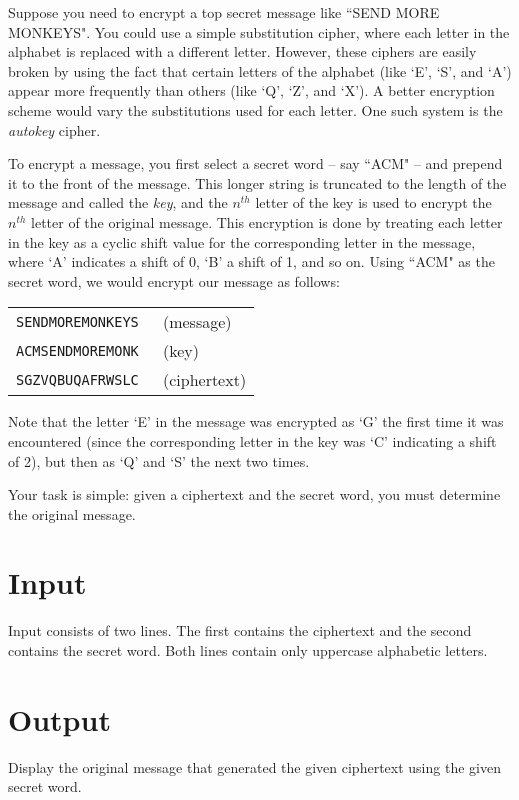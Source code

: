
Suppose you need to encrypt a top secret message like ``SEND MORE MONKEYS".
You could use a simple substitution cipher, where each letter in the alphabet is
replaced with a different letter.  However, these ciphers are easily broken
by using the
fact that certain letters of the alphabet (like `E', `S', and `A') appear more
frequently than others (like `Q', `Z', and `X').  A better encryption scheme would
vary the substitutions used for each letter.  One such system is the
{\it autokey} cipher.

To encrypt a message, you first select a secret word -- say ``ACM" -- and prepend
it to the front of the message.  This longer string is truncated to the length
of the message and called the
{\it key}, and the $n^{th}$ letter of the key is used to encrypt the
$n^{th}$ letter of
the original message.  This encryption is done by treating each letter in the
key as a cyclic shift value for the corresponding letter in the message, where
`A' indicates a shift of 0, `B' a shift of 1, and so on.  Using ``ACM" as the
secret word, we would encrypt our message as follows:
\begin{center}
\begin{tabular}{ll}
\tt SENDMOREMONKEYS & (message) \\
\tt ACMSENDMOREMONK & (key) \\ \hline
\tt SGZVQBUQAFRWSLC & (ciphertext) \\
\end{tabular}
\end{center}
Note that the letter `E' in the message was encrypted as `G' the first time it
was encountered (since the corresponding letter in the key was `C' indicating
a shift of 2), but then as `Q' and `S' the next two times.

Your task is simple: given a ciphertext and the secret word, you must determine
the original message.

\section*{Input}
Input consists of two lines.  The first contains the ciphertext and the
second contains the secret word.  Both lines contain only uppercase
alphabetic letters.

\section*{Output}
Display the original message that generated the given ciphertext using the
given secret word.

